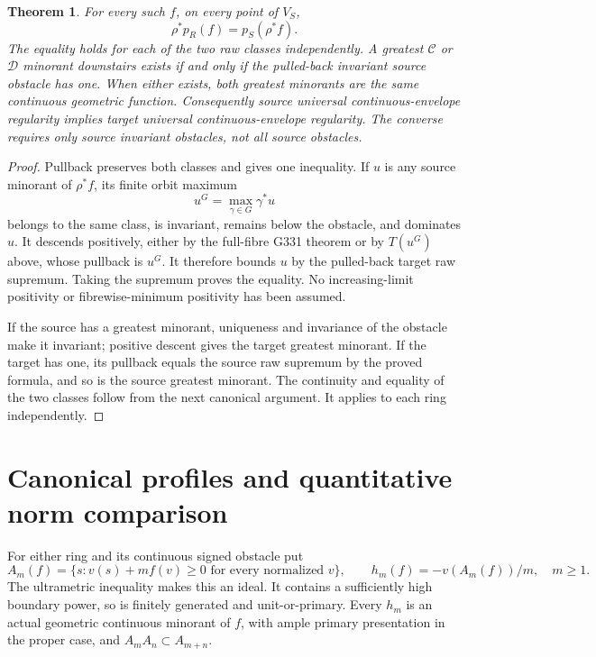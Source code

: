 \documentclass[11pt]{article}
\newtheorem{theorem}{Theorem}
\newcommand{\C}{\mathcal C}
\newcommand{\D}{\mathcal D}
\begin{document}
\begin{theorem}\label{orbit:envelope}
For every such $f$, on every point of $V_S$,
\[
 \rho^*p_R(f)=p_S(\rho^*f).
\]
The equality holds for each of the two raw classes independently.
A greatest $\C$ or $\D$ minorant downstairs exists if and only if
the pulled-back invariant source obstacle has one. When either exists,
both greatest minorants are the same continuous geometric function.
Consequently source universal continuous-envelope regularity implies
target universal continuous-envelope regularity. The converse requires
only source invariant obstacles, not all source obstacles.
\end{theorem}
\begin{proof}
Pullback preserves both classes and gives one inequality. If $u$ is any
source minorant of $\rho^*f$, its finite orbit maximum
\[
 u^G=\max_{\gamma\in G}\gamma^*u
\]
belongs to the same class, is invariant, remains below the obstacle,
and dominates $u$. It descends positively, either by the full-fibre
G331 theorem or by $T(u^G)$ above, whose pullback is $u^G$.
It therefore bounds $u$ by the pulled-back target raw supremum.
Taking the supremum proves the equality. No increasing-limit positivity
or fibrewise-minimum positivity has been assumed.

If the source has a greatest minorant, uniqueness and invariance of the
obstacle make it invariant; positive descent gives the target greatest
minorant. If the target has one, its pullback equals the source raw
supremum by the proved formula, and so is the source greatest minorant.
The continuity and equality of the two classes follow from the next
canonical argument. It applies to each ring independently.
\end{proof}

\section{Canonical profiles and quantitative norm comparison}
For either ring and its continuous signed obstacle put
\[
 A_m(f)=\{s:v(s)+mf(v)\ge0\text{ for every normalized }v\},
 \qquad h_m(f)=-v(A_m(f))/m,\quad m\ge1.
\]
The ultrametric inequality makes this an ideal. It contains a sufficiently
high boundary power, so is finitely generated and unit-or-primary.
Every $h_m$ is an actual geometric continuous minorant of $f$, with
ample primary presentation in the proper case, and
$A_mA_n\subset A_{m+n}$.
\end{document}
